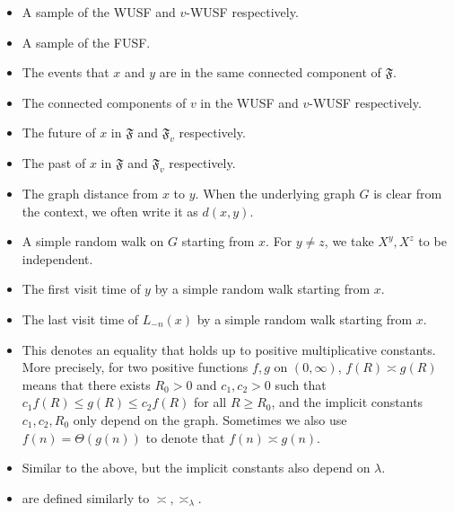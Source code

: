 \documentclass[12pt]{article}
\numberwithin{equation}{section}
\newcommand{\1}{\mathbf{1}}
\begin{document}
 \begin{itemize}[leftmargin=4cm]
 	\item  [$\mathfrak{F}, \mathfrak{F}_v$] A sample of the WUSF and $v$-WUSF respectively.
 	
 	\item  [$\mathfrak{F}^f$] A sample of the FUSF.
 	
 	\item  [$x\leftrightarrow y$] The events that $x$ and $y$ are in the same connected component of $\mathfrak{F}$.
 	
 	\item [$T_v,\mathfrak{T}_v$] The connected components of $v$ in the WUSF and $v$-WUSF respectively. 
 	
 	\item [$\mathfrak{F}(x,\infty),\mathfrak{F}_{v}(x,\infty)$]  The future of $x$ in $\mathfrak{F}$ and $\mathfrak{F}_v$ respectively.
 	
 	\item  [$\mathfrak{P}(x),\mathfrak{P}_v(x)$] The past of $x$ in $\mathfrak{F}$ and $\mathfrak{F}_v$ respectively.
 	
 	
 	\item [$d_G(x,y)$] The graph distance from $x$ to $y$. When the underlying graph $G$ is clear from the context, we often write it as $d(x,y)$. 
 	
 	\item [$\{X_k^x\}_{k\geq 0}$] A simple random walk on $G$ starting from $x$. For  $y\neq z$, we take $X^y,X^z$  to be independent. 
 	
 	\item [$\sigma_y^x$] The first visit time of $y$ by a simple random walk starting from $x$. 
 	
 	\item  [$\tau_{-n}^x$] The last visit time of $L_{-n}(x)$ by a simple random walk starting from $x$. 
 
 
 \item [$\asymp $] This denotes an equality that holds up to positive multiplicative constants. More precisely, for two positive functions $f,g$ on $(0,\infty)$, $f(R)\asymp g(R)$ means that there exists $R_0>0$ and $c_1,c_2>0$ such that $c_1f(R)\leq g(R)\leq c_2 f(R)$ for all $R\geq R_0$, and the implicit constants $c_1,c_2, R_0$ only depend on the graph. Sometimes we also use $f(n)=\Theta(g(n))$ to denote that $f(n)\asymp g(n)$.
 
 \item [$\asymp_{\lambda} $] Similar to the above, but the implicit constants also depend on $\lambda$.
 
 \item  [$\preceq,\preceq_\lambda $ and $\succeq, \succeq_\lambda $] are defined similarly to $\asymp,\asymp_\lambda$. 
 \end{itemize}
 
\end{document}
